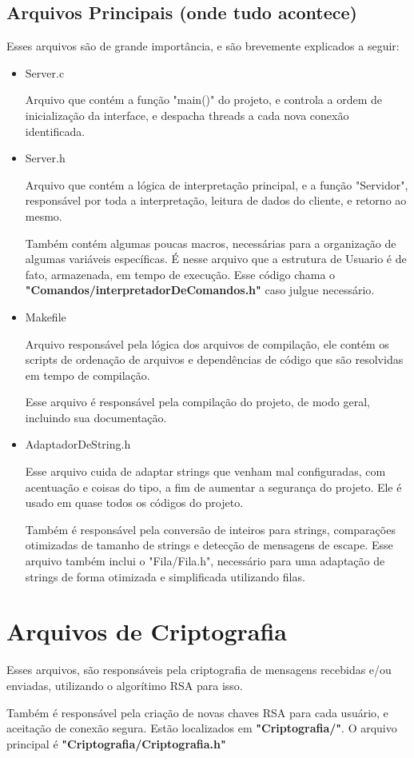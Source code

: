\documentclass[onecolumn,12pt]{article}
\begin{document}
			\subsection{Arquivos Principais (onde tudo acontece)}
				Esses arquivos são de grande importância, e são brevemente explicados a seguir:
				\begin{itemize}
					\item{Server.c}\par
						Arquivo que contém a função "main()" do projeto, e controla a ordem de inicialização da interface, e despacha threads a cada nova conexão identificada.

					\item{Server.h}\par
						Arquivo que contém a lógica de interpretação principal, e a função "Servidor", responsável por toda a interpretação, leitura de dados do cliente, e retorno ao mesmo.\par
						Também contém algumas poucas macros, necessárias para a organização de algumas variáveis específicas. É nesse arquivo que a estrutura de Usuario é de fato, armazenada, em tempo de execução. Esse código chama o \textbf{"Comandos/interpretadorDeComandos.h"} caso julgue necessário.

					\item{Makefile}\par
						Arquivo responsável pela lógica dos arquivos de compilação, ele contém os scripts de ordenação de arquivos e dependências de código que são resolvidas em tempo de compilação.\par
						Esse arquivo é responsável pela compilação do projeto, de modo geral, incluindo sua documentação.

					\item{AdaptadorDeString.h}\par
						Esse arquivo cuida de adaptar strings que venham mal configuradas, com acentuação e coisas do tipo, a fim de aumentar a segurança do projeto. Ele é usado em quase todos os códigos do projeto.\par
						Também é responsável pela conversão de inteiros para strings, comparações otimizadas de tamanho de strings e detecção de mensagens de escape.
						Esse arquivo também inclui o "Fila/Fila.h", necessário para uma adaptação de strings de forma otimizada e simplificada utilizando filas.

				\end{itemize}

		\section{Arquivos de Criptografia}
			Esses arquivos, são responsáveis pela criptografia de mensagens recebidas e/ou enviadas, utilizando o algorítimo RSA para isso.\par
			Também é responsável pela criação de novas chaves RSA para cada usuário, e aceitação de conexão segura.
			Estão localizados em \textbf{"Criptografia/"}.
			O arquivo principal é \textbf{"Criptografia/Criptografia.h"}
\end{document}

